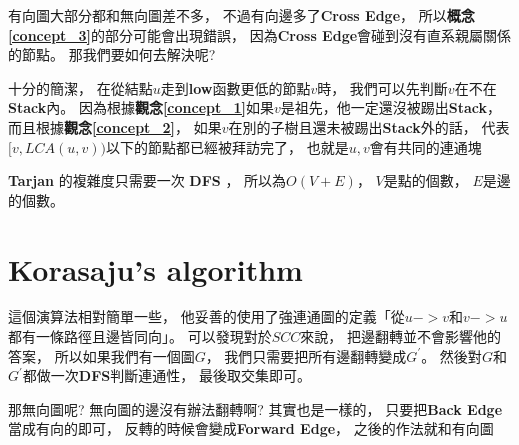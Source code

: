 \documentclass[12pt,oneside]{article}
\begin{document}
有向圖大部分都和無向圖差不多，
不過有向邊多了\textbf{Cross Edge}，
所以\textbf{概念\ref{concept_3}}的部分可能會出現錯誤，
因為\textbf{Cross Edge}會碰到沒有直系親屬關係的節點。
那我們要如何去解決呢?

十分的簡潔，
在從結點$u$走到\textbf{low}函數更低的節點$v$時，
我們可以先判斷$v$在不在\textbf{Stack}內。
因為根據\textbf{觀念\ref{concept_1}}如果$v$是祖先，他一定還沒被踢出\textbf{Stack}，
而且根據\textbf{觀念\ref{concept_2}}，
如果$v$在別的子樹且還未被踢出\textbf{Stack}外的話，
代表$[ v, LCA(u, v) )$以下的節點都已經被拜訪完了，
也就是$u, v$會有共同的連通塊

\textbf{Tarjan} 的複雜度只需要一次 \textbf{DFS} ， 所以為$O(V+E)$，
$V$是點的個數，
$E$是邊的個數。

\section{Korasaju's algorithm}
這個演算法相對簡單一些，
他妥善的使用了強連通圖的定義「從$u->v$和$v->u$都有一條路徑且邊皆同向」。
可以發現對於$SCC$來說，
把邊翻轉並不會影響他的答案，
所以如果我們有一個圖$G$，
我們只需要把所有邊翻轉變成$G^{'}$。
然後對$G$和$G^{'}$都做一次\textbf{DFS}判斷連通性，
最後取交集即可。

那無向圖呢?
無向圖的邊沒有辦法翻轉啊?
其實也是一樣的，
只要把\textbf{Back Edge}當成有向的即可，
反轉的時候會變成\textbf{Forward Edge}，
之後的作法就和有向圖
\end{document}
